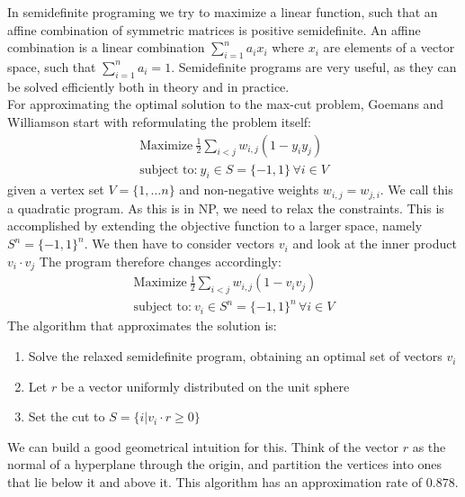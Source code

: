 In semidefinite programing we try to maximize a linear function, such that an affine combination of symmetric matrices is positive semidefinite. \cite{vandenberghe96}
An affine combination is a linear combination $\sum_{i=1}^{n}a_ix_i$
 where $x_i$ are elements of a vector space, such that $\sum_{i=1}^{n}a_i=1$.
Semidefinite programs are very useful, as they can be solved efficiently both in theory and in practice.\\
For approximating the optimal solution to the max-cut problem, Goemans and Williamson \cite{goemans95} start with reformulating the problem itself: \begin{align*}
	\text{Maximize}\ \frac{1}{2}\sum_{i<j} w_{i,j}\left( 1-y_iy_j \right) \\
	\text{subject to:}\ y_i \in S=\{-1,1\}\, \forall i \in V
\end{align*}
given a vertex set $ V=\{1,\ldots n\} $ and non-negative weights $w_{i,j}=w_{j,i}$.
We call this a quadratic program.
As this is in NP, we need to relax the constraints.
This is accomplished by extending the objective function to a larger space, namely $S^n= \{-1,1\}^n$.
We then have to consider vectors $v_i$ and look at the inner product  $v_i\cdot v_j$
The program therefore changes accordingly:
 \begin{align*}
	\label{eq:}
	\text{Maximize}\ \frac{1}{2}\sum_{i<j} w_{i,j}\left( 1-v_iv_j \right) \\
	\text{subject to:}\ v_i \in S^n=\{-1,1\}^n\, \forall i \in V
\end{align*}
The algorithm that approximates the solution is:
\begin{enumerate}
	\item Solve the relaxed semidefinite program, obtaining an optimal set of vectors $v_i$
	\item Let $r$ be a vector uniformly distributed on the unit sphere
	\item Set the cut to $S=\{i|v_i\cdot r \ge 0\} $
\end{enumerate}
We can build a good geometrical intuition for this.
Think of the vector $r$ as the normal of a hyperplane through the origin, and partition the vertices into ones that lie below it and above it.
This algorithm has an approximation rate of $0.878$.
